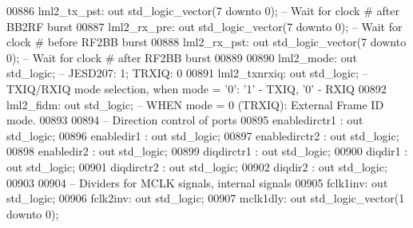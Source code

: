 \begin{DoxyCode}
00886         lml2\_tx\_pst: \textcolor{keywordflow}{out} \textcolor{comment}{std\_logic\_vector}(\textcolor{vhdllogic}{}\textcolor{vhdllogic}{7} \textcolor{keywordflow}{downto} \textcolor{vhdllogic}{}\textcolor{vhdllogic}{0});  \textcolor{keyword}{-- Wait for clock # after BB2RF burst}
00887         lml2\_rx\_pre: \textcolor{keywordflow}{out} \textcolor{comment}{std\_logic\_vector}(\textcolor{vhdllogic}{}\textcolor{vhdllogic}{7} \textcolor{keywordflow}{downto} \textcolor{vhdllogic}{}\textcolor{vhdllogic}{0});  \textcolor{keyword}{-- Wait for clock # before RF2BB burst}
00888         lml2\_rx\_pst: \textcolor{keywordflow}{out} \textcolor{comment}{std\_logic\_vector}(\textcolor{vhdllogic}{}\textcolor{vhdllogic}{7} \textcolor{keywordflow}{downto} \textcolor{vhdllogic}{}\textcolor{vhdllogic}{0});  \textcolor{keyword}{-- Wait for clock # after RF2BB burst}
00889 
00890     lml2\_mode: \textcolor{keywordflow}{out} \textcolor{comment}{std\_logic}; \textcolor{keyword}{-- JESD207: 1; TRXIQ: 0}
00891         lml2\_txnrxiq: \textcolor{keywordflow}{out} \textcolor{comment}{std\_logic};        \textcolor{keyword}{-- TXIQ/RXIQ mode selection, when mode = '0': '1' - TXIQ, '0' -
       RXIQ}
00892     lml2\_fidm: \textcolor{keywordflow}{out} \textcolor{comment}{std\_logic}; \textcolor{keyword}{-- WHEN mode = 0 (TRXIQ): External Frame ID mode. }
00893         
00894 \textcolor{keyword}{        -- Direction control of ports}
00895         enabledirctr1   : \textcolor{keywordflow}{out} \textcolor{comment}{std\_logic};
00896         enabledir1      : \textcolor{keywordflow}{out} \textcolor{comment}{std\_logic};
00897         enabledirctr2   : \textcolor{keywordflow}{out} \textcolor{comment}{std\_logic};
00898         enabledir2      : \textcolor{keywordflow}{out} \textcolor{comment}{std\_logic};
00899         diqdirctr1      : \textcolor{keywordflow}{out} \textcolor{comment}{std\_logic};
00900         diqdir1             : \textcolor{keywordflow}{out} \textcolor{comment}{std\_logic};
00901         diqdirctr2      : \textcolor{keywordflow}{out} \textcolor{comment}{std\_logic};
00902         diqdir2             : \textcolor{keywordflow}{out} \textcolor{comment}{std\_logic};
00903         
00904 \textcolor{keyword}{        -- Dividers for MCLK signals, internal signals}
00905         fclk1inv: \textcolor{keywordflow}{out} \textcolor{comment}{std\_logic};
00906         fclk2inv: \textcolor{keywordflow}{out} \textcolor{comment}{std\_logic};
00907         mclk1dly: \textcolor{keywordflow}{out} \textcolor{comment}{std\_logic\_vector}(\textcolor{vhdllogic}{}\textcolor{vhdllogic}{1} \textcolor{keywordflow}{downto} \textcolor{vhdllogic}{}\textcolor{vhdllogic}{0});

\end{DoxyCode}
